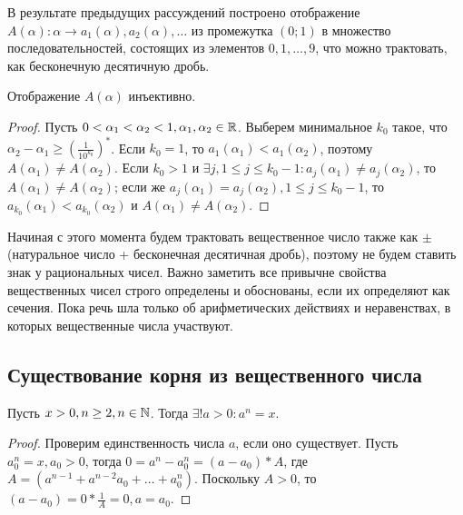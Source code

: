 \documentclass[main]{subfiles}
\begin{document}
В результате предыдущих рассуждений построено отображение $A(\alpha): \alpha 
\rightarrow a_1(\alpha), a_2(\alpha), \ldots$ из промежутка $(0; 1)$ в 
множество последовательностей, состоящих из элементов $0, 1, \ldots, 9$, 
что можно трактовать, как бесконечную десятичную дробь.

\begin{assertion}
    Отображение $A(\alpha)$ инъективно.
\end{assertion}
\begin{proof}
    Пусть $0 < \alpha_1 < \alpha_2 < 1, \alpha_1,\alpha_2 \in \mathbb{R}$. Выберем 
    минимальное $k_0$ такое, что $\alpha_2 - \alpha_1 \geq 
    \left(\frac{1}{10^{k_0}}\right)^*$. Если $k_0 = 1$, то $a_1(\alpha_1) <
    a_1(\alpha_2)$, поэтому $A(\alpha_1) \neq A(\alpha_2)$.
    Если $k_0 > 1$ и $\exists j, 1 \leq j \leq k_0 - 1 : a_j(\alpha_1) \neq 
    a_j(\alpha_2)$, то $A(\alpha_1) \neq A(\alpha_2)$; если же 
    $a_j(\alpha_1) = a_j(\alpha_2), 1 \leq j \leq k_0 - 1$, то 
    $a_{k_0}(\alpha_1) < a_{k_0}(\alpha_2)$ и $A(\alpha_1) \neq A(\alpha_2)$.
\end{proof}

Начиная с этого момента будем трактовать вещественное число также как $\pm$ 
(натуральное число + бесконечная десятичная дробь), поэтому не будем ставить 
знак у рациональных чисел. Важно заметить все привычне свойства вещественных 
чисел строго определены и обоснованы, если их определяют как сечения.
Пока речь шла только об арифметических действиях и неравенствах, в которых 
вещественные числа участвуют.

\subsection{Существование корня из вещественного числа}
\begin{theorem}
    Пусть $x > 0, n \geq 2, n \in \mathbb{N}$. Тогда $\exists! a > 0 : a^n = x$.
\end{theorem}
\begin{proof}
    Проверим единственность числа $a$, если оно существует. Пусть $a_0^n = x,
    a_0 > 0$, тогда $0 = a^n - a_0^n = (a - a_0)*A$, где $A = (a^{n-1} + 
    a^{n-2}a_0 + \ldots + a_0^n)$.
    Поскольку $A > 0$, то $(a - a_0) = 0 * \frac{1}{A} = 0, a = a_0$.
\end{proof}
\end{document}
